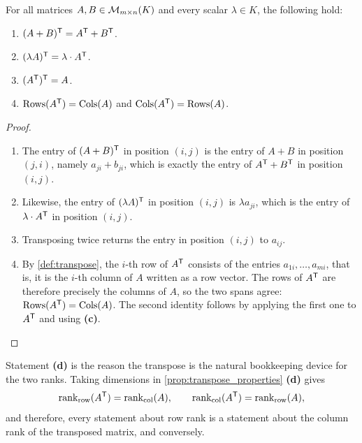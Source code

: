 \begin{proposition}
\label{prop:transpose_properties}
For all matrices $A, B \in \mathcal{M}_{m \times n}(K)$ and every scalar $\lambda \in K$, the following hold:
\begin{enumerate}[label=\textbf{(\alph*)}]
    \item $(A + B)^{\mathsf{T}} = A^{\mathsf{T}} + B^{\mathsf{T}}$.
    \item $(\lambda A)^{\mathsf{T}} = \lambda \cdot A^{\mathsf{T}}$.
    \item $(A^{\mathsf{T}})^{\mathsf{T}} = A$.
    \item $\operatorname{Rows}(A^{\mathsf{T}}) = \operatorname{Cols}(A)$ and $\operatorname{Cols}(A^{\mathsf{T}}) = \operatorname{Rows}(A)$.
\end{enumerate}
\end{proposition}

\begin{proof}
\begin{enumerate}[label=\textbf{(\alph*)}]
    \item The entry of $(A+B)^{\mathsf{T}}$ in position $(i,j)$ is the entry of $A + B$ in position $(j,i)$, namely $a_{ji} + b_{ji}$, which is exactly the entry of $A^{\mathsf{T}} + B^{\mathsf{T}}$ in position $(i,j)$.
    \item Likewise, the entry of $(\lambda A)^{\mathsf{T}}$ in position $(i,j)$ is $\lambda a_{ji}$, which is the entry of $\lambda \cdot A^{\mathsf{T}}$ in position $(i,j)$.
    \item Transposing twice returns the entry in position $(i,j)$ to $a_{ij}$.
    \item By \cref{def:transpose}, the $i$-th row of $A^{\mathsf{T}}$ consists of the entries $a_{1i}, \dots, a_{mi}$, that is, it is the $i$-th column of $A$ written as a row vector. The rows of $A^{\mathsf{T}}$ are therefore precisely the columns of $A$, so the two spans agree: $\operatorname{Rows}(A^{\mathsf{T}}) = \operatorname{Cols}(A)$. The second identity follows by applying the first one to $A^{\mathsf{T}}$ and using \textbf{(c)}. \qedhere
\end{enumerate}
\end{proof}

\begin{remark}
Statement \textbf{(d)} is the reason the transpose is the natural bookkeeping device for the two ranks. Taking dimensions in \cref{prop:transpose_properties} \textbf{(d)} gives
\[
\operatorname{rank}_{\text{row}}(A^{\mathsf{T}}) = \operatorname{rank}_{\text{col}}(A), \qquad \operatorname{rank}_{\text{col}}(A^{\mathsf{T}}) = \operatorname{rank}_{\text{row}}(A),
\]
and therefore, every statement about row rank is a statement about the column rank of the transposed matrix, and conversely.
\end{remark}

